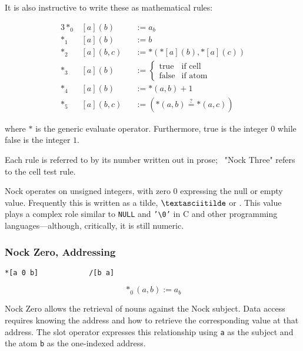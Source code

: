 It is also instructive to write these as mathematical rules:

\begin{alignat*}{3}
*_{0}&[a](b) &&:= a_{b} \\
*_{1}&[a](b) &&:= b \\
*_{2}&[a](b,c) &&:= *({*[a](b)}, {*[a](c)}) \\
*_{3}&[a](b) &&:= \left\{\begin{matrix} \textrm{true} & \text{if cell} \\ \textrm{false} & \text{if atom} \end{matrix} \right. \\
*_{4}&[a](b) &&:= {*(a,b) + 1} \\
*_{5}&[a](b,c) &&:= ({*(a,b)} \stackrel{?}{=} {*(a,c)})
\end{alignat*}

where $*$ is the generic evaluate operator.  Furthermore, \textrm{true} is the integer $0$ while \textrm{false} is the integer $1$.


Each rule is referred to by its number written out in prose; \eg~"Nock Three" refers to the cell test rule.

Nock operates on unsigned integers, with zero $0$ expressing the null or empty value.  Frequently this is written as a tilde, $\textasciitilde$ or \nullchr.  This value plays a complex role similar to \texttt{NULL} and \texttt{'\textbackslash 0'} in C and other programming languages—although, critically, it is still numeric.

\subsubsection[Nock Zero]{Nock Zero, Addressing}

\begin{lstlisting}[style=nonumbers]
*[a 0 b]            /[b a]
\end{lstlisting}

$$
*_{0}(a,b) := a_{b}
$$

Nock Zero allows the retrieval of nouns against the Nock subject.  Data access requires knowing the address and how to retrieve the corresponding value at that address.  The slot operator expresses this relationship using \texttt{a} as the subject and the atom \texttt{b} as the one-indexed address.

